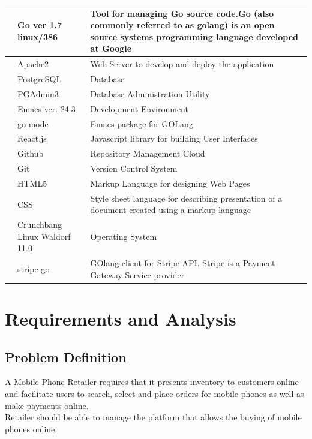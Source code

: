 \documentclass[hidelinks,a4paper,12pt]{article}
\begin{document}
\begin{center}
{\begin{tabularx}{\textwidth}{ | >{\ttfamily\raggedright\arraybackslash} s 
		  | >{\ttfamily\raggedright\arraybackslash} t 
		  | >{\ttfamily\raggedright\arraybackslash} t | }
		 & Go ver 1.7 linux/386 & Tool for managing Go source code.Go (also commonly referred to as golang) is an open source systems programming language developed at Google  \\
	     & Apache2 & Web Server to develop and deploy the application  \\
	     & PostgreSQL & Database  \\ [1em]
	     & PGAdmin3 & Database Administration Utility  \\  [1em]
	     & Emacs ver. 24.3 & Development Environment  \\ 
	     & go-mode & Emacs package for GOLang \\ [1em]
	     & React.js & Javascript library for building User Interfaces \\ [1em]
	     & Github & Repository Management Cloud  \\ [1em]
	     & Git & Version Control System  \\ [1em]
	     & HTML5 & Markup Language for designing Web Pages  \\ [1em]
	     & CSS & Style sheet language for describing presentation of a document created using a markup language  \\ [1em]
	     & Crunchbang Linux Waldorf 11.0 & Operating System   \\ 
	     & stripe-go & GOlang client for Stripe API. Stripe is a Payment Gateway Service provider   \\ 
	    \hline	   	    		       	           								
		\end{tabularx}
		}
		\end{center}
						
		\noindent
						

\bigskip

\newpage

\section{Requirements and Analysis}

\subsection{Problem Definition}
A Mobile Phone Retailer requires that it presents inventory to customers online and facilitate users to search, select and place orders for mobile phones as well as make payments online.
\\
Retailer should be able to manage the platform that allows the buying of mobile phones online.
\end{document}

